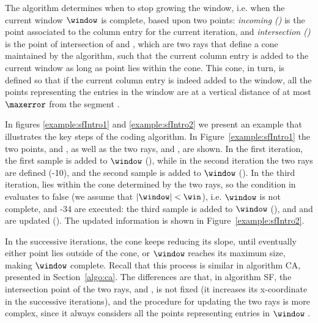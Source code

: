 

\vspace{-5pt}



The algorithm determines when to stop growing the window, i.e. when the current window $\window$ is complete, based upon two points: \textit{incoming (\incoming)} is the point associated to the column entry for the current iteration, and \textit{intersection (\intersection)} is the point of intersection of \smin and \smax, which are two rays that define a cone maintained by the algorithm, such that the current column entry is added to the current window as long as point \incoming lies within the cone. This cone, in turn, is defined so that if the current column entry is indeed added to the window, all the points representing the entries in the window are at a vertical distance of at most $\maxerror$ from the segment \interSegmentSF.


In figures \ref{example:sfIntro1} and \ref{example:sfIntro2} we present an example that illustrates the key steps of the coding algorithm. In Figure~\ref{example:sfIntro1} the two points, \incoming and \intersection, as well as the two rays, \smin and \smax, are shown. In the first iteration, the first sample is added to $\window$ (), while in the second iteration the two rays are defined (-10), and the second sample is added to $\window$ (). In the third iteration, \incoming lies within the cone determined by the two rays, so the condition in  evaluates to false (we assume that $|\window|<\win$), i.e. $\window$ is not complete, and -34 are executed: the third sample is added to $\window$ (), and \smin and \smax are updated (). The updated information is shown in Figure~\ref{example:sfIntro2}.


\vspace{+2pt}
\exampleSF


In the successive iterations, the cone keeps reducing its slope, until eventually either point \incoming lies outside of the cone, or $\window$ reaches its maximum size, making $\window$ complete. Recall that this process is similar in algorithm CA, presented in Section~\ref{algo:ca}. The differences are that, in algorithm SF, the intersection point of the two rays, \smin and \smax, is not fixed (it increases its x-coordinate in the successive iterations), and the procedure for updating the two rays is more complex, since it always considers all the points representing entries in $\window$ \cite{coder:sf}.


